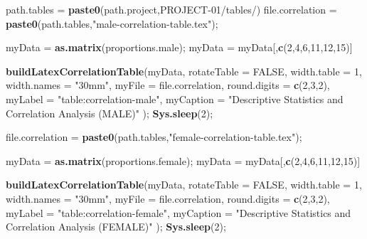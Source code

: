 \documentclass[]{article}
\newenvironment{Shaded}{\begin{snugshade}}{\end{snugshade}}
\newcommand{\DataTypeTok}[1]{\textcolor[rgb]{0.13,0.29,0.53}{#1}}
\newcommand{\DecValTok}[1]{\textcolor[rgb]{0.00,0.00,0.81}{#1}}
\newcommand{\KeywordTok}[1]{\textcolor[rgb]{0.13,0.29,0.53}{\textbf{#1}}}
\newcommand{\NormalTok}[1]{#1}
\newcommand{\OtherTok}[1]{\textcolor[rgb]{0.56,0.35,0.01}{#1}}
\newcommand{\StringTok}[1]{\textcolor[rgb]{0.31,0.60,0.02}{#1}}
\begin{document}
\begin{Shaded}
\begin{Highlighting}[]
\NormalTok{path.tables =}\StringTok{ }\KeywordTok{paste0}\NormalTok{(path.project,}\StringTok{\textquotesingle{}PROJECT{-}01/tables/\textquotesingle{}}\NormalTok{)}
\NormalTok{file.correlation =}\StringTok{ }\KeywordTok{paste0}\NormalTok{(path.tables,}\StringTok{"male{-}correlation{-}table.tex"}\NormalTok{);}

\NormalTok{myData =}\StringTok{ }\KeywordTok{as.matrix}\NormalTok{(proportions.male);}
\NormalTok{myData =}\StringTok{ }\NormalTok{myData[,}\KeywordTok{c}\NormalTok{(}\DecValTok{2}\NormalTok{,}\DecValTok{4}\NormalTok{,}\DecValTok{6}\NormalTok{,}\DecValTok{11}\NormalTok{,}\DecValTok{12}\NormalTok{,}\DecValTok{15}\NormalTok{)]}

\KeywordTok{buildLatexCorrelationTable}\NormalTok{(myData, }
  \DataTypeTok{rotateTable =} \OtherTok{FALSE}\NormalTok{,}
  \DataTypeTok{width.table =} \DecValTok{1}\NormalTok{,}
  \DataTypeTok{width.names =} \StringTok{"30mm"}\NormalTok{,}
  \DataTypeTok{myFile =}\NormalTok{ file.correlation,}
  \DataTypeTok{round.digits =} \KeywordTok{c}\NormalTok{(}\DecValTok{2}\NormalTok{,}\DecValTok{3}\NormalTok{,}\DecValTok{2}\NormalTok{),}
  \DataTypeTok{myLabel =} \StringTok{"table:correlation{-}male"}\NormalTok{,}
  \DataTypeTok{myCaption =} \StringTok{"Descriptive Statistics and Correlation Analysis (MALE)"}
\NormalTok{  );}
\KeywordTok{Sys.sleep}\NormalTok{(}\DecValTok{2}\NormalTok{);}

\NormalTok{file.correlation =}\StringTok{ }\KeywordTok{paste0}\NormalTok{(path.tables,}\StringTok{"female{-}correlation{-}table.tex"}\NormalTok{);}

\NormalTok{myData =}\StringTok{ }\KeywordTok{as.matrix}\NormalTok{(proportions.female);}
\NormalTok{myData =}\StringTok{ }\NormalTok{myData[,}\KeywordTok{c}\NormalTok{(}\DecValTok{2}\NormalTok{,}\DecValTok{4}\NormalTok{,}\DecValTok{6}\NormalTok{,}\DecValTok{11}\NormalTok{,}\DecValTok{12}\NormalTok{,}\DecValTok{15}\NormalTok{)]}

\KeywordTok{buildLatexCorrelationTable}\NormalTok{(myData, }
  \DataTypeTok{rotateTable =} \OtherTok{FALSE}\NormalTok{,}
  \DataTypeTok{width.table =} \DecValTok{1}\NormalTok{,}
  \DataTypeTok{width.names =} \StringTok{"30mm"}\NormalTok{,}
  \DataTypeTok{myFile =}\NormalTok{ file.correlation,}
  \DataTypeTok{round.digits =} \KeywordTok{c}\NormalTok{(}\DecValTok{2}\NormalTok{,}\DecValTok{3}\NormalTok{,}\DecValTok{2}\NormalTok{),}
  \DataTypeTok{myLabel =} \StringTok{"table:correlation{-}female"}\NormalTok{,}
  \DataTypeTok{myCaption =} \StringTok{"Descriptive Statistics and Correlation Analysis (FEMALE)"}
\NormalTok{  );}
\KeywordTok{Sys.sleep}\NormalTok{(}\DecValTok{2}\NormalTok{);}
\end{Highlighting}
\end{Shaded}
\end{document}
